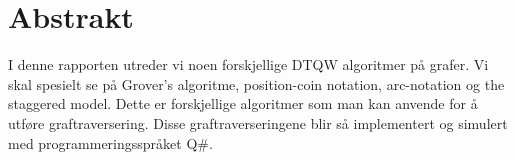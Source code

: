 \documentclass[
10pt, %
a4  paper, %
twoside, %
headinclude,footinclude, %
BCOR=5mm, %
]{scrartcl}
\title{\normalfont\spacedallcaps{Kvantevandringer}} %
\author{\spacedlowsmallcaps{Thomas Wilskow Thorbjørnsen}} %
\date{\today} %
\begin{document}


\renewcommand{\sectionmark}[1]{\markright{\spacedlowsmallcaps{#1}}} %
\renewcommand{\subsectionmark}[1]{\markright{\thesubsection~#1}} %
\lehead{\mbox{\llap{\small\thepage\kern1em\color{halfgray} \vline}\color{halfgray}\hspace{0.5em}\rightmark\hfil}} %

\pagestyle{scrheadings} %


\maketitle %

\setcounter{tocdepth}{2} %

\tableofcontents %

\listoffigures %



\section*{Abstrakt} 

I denne rapporten utreder vi noen forskjellige DTQW algoritmer på grafer. Vi skal spesielt se på Grover's algoritme, position-coin notation, arc-notation og the staggered model. Dette er forskjellige algoritmer som man kan anvende for å utføre graftraversering. Disse graftraverseringene blir så implementert og simulert med programmeringsspråket Q\#.
\end{document}

